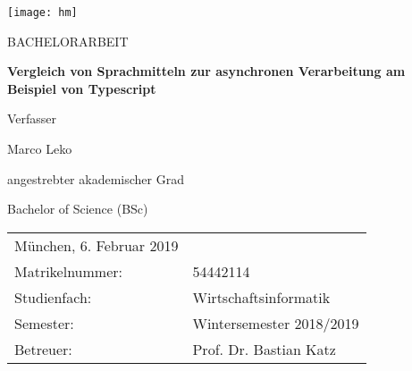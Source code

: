 \begin{titlepage}
\begin{minipage}{0.9\linewidth}
\begin{center}
\centering 
	      		 
\texttt{[image: hm]}
	
\begin{center}
\Huge{\textsc{BACHELORARBEIT}}
\end{center}

\vspace{.75cm}
{\fontsize{20}{22.5}\selectfont \textbf{Vergleich von Sprachmitteln\linebreak
zur asynchronen Verarbeitung\linebreak
am Beispiel von Typescript}\par}
\vspace{1cm}
    
  
Verfasser  \linebreak
 {\Large Marco Leko\par}
 	\vspace{1.5cm}
angestrebter akademischer Grad\linebreak
 {\Large Bachelor of Science (BSc)\par}
	\vspace{1cm}

\flushleft
\begin{tabular}{ll}
München, 6. Februar 2019\linebreak

\vspace{1cm}&   \\
  Matrikelnummer: & 54442114 \vspace{0.3cm} \\ 
  Studienfach: & Wirtschaftsinformatik \vspace{0.3cm} \\
  Semester: & Wintersemester 2018/2019 \vspace{0.3cm} \\ 
  Betreuer: & Prof. Dr. Bastian Katz \\
 \end{tabular}

\end{center}
\end{minipage}
\end{titlepage}